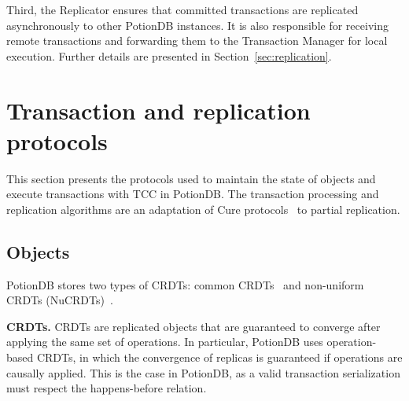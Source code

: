 \documentclass[sigplan,twocolumn,review,anonymous]{acmart}
\begin{document}
Third,  the Replicator ensures that committed transactions are replicated asynchronously to other PotionDB instances.
	It is also responsible for receiving remote transactions and forwarding them to the Transaction Manager for local execution.
	Further details are presented in Section~\ref{sec:replication}.






\section{Transaction and replication protocols}
\label{sec:transactions}

This section presents the 
protocols used to maintain the state of objects
and execute transactions with TCC in PotionDB. The transaction processing and replication
algorithms are an adaptation of Cure protocols~\cite{cure} to partial replication.

\subsection{Objects}
\label{sec:tx:objs}

PotionDB stores two types of CRDTs: common CRDTs~\cite{crdt} and non-uniform CRDTs (NuCRDTs)~\cite{Cabrita17Nonuniform}.

\noindent
\textbf{CRDTs.} CRDTs are replicated objects that are guaranteed to converge
after applying the same set of operations. In particular, PotionDB uses operation-based CRDTs,
in which the convergence of replicas is guaranteed if operations are causally applied.
This is the case in PotionDB, as a valid transaction serialization must respect the happens-before
relation.
\end{document}
